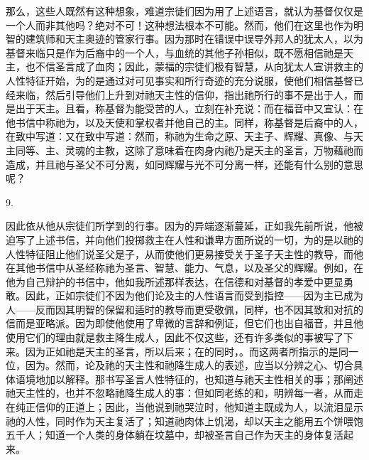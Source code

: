 那么，这些人既然有这种想象，难道宗徒们因为用了上述语言，就认为基督仅仅是一个人而非其他吗？绝对不可！这种想法根本不可能。然而，他们在这里也作为明智的建筑师和天主奥迹的管家行事。因为那时在错误中误导外邦人的犹太人，以为基督来临只是作为后裔中的一个人，与血统的其他子孙相似，既不愿相信祂是天主，也不信圣言成了血肉；因此，蒙福的宗徒们极有智慧，从向犹太人宣讲救主的人性特征开始，为的是通过对可见事实和所行奇迹的充分说服，使他们相信基督已经来临，然后引导他们上升到对祂天主性的信仰，指出祂所行的事不是出于人，而是出于天主。且看，称基督为能受苦的人，立刻在补充说：而在福音中又宣认：在他书信中称祂为，以及天使和掌权者并他自己的主。同样，称基督是后裔中的人，在致中写道：又在致中写道：然而，称祂为生命之原、天主子、辉耀、真像、与天主同等、主、灵魂的主教，这除了意味着在肉身内祂乃是天主的圣言，万物藉祂而造成，并且祂与圣父不可分离，如同辉耀与光不可分离一样，还能有什么别的意思呢？\par

9. \par

因此依从他从宗徒们所学到的行事。因为的异端逐渐蔓延，正如我先前所说，他被迫写了上述书信，并向他们投掷救主在人性和谦卑方面所说的一切，为的是以祂的人性特征阻止他们说圣父是子，从而使他们更易接受关于圣子天主性的教导，而他在其他书信中从圣经称祂为圣言、智慧、能力、气息，以及圣父的辉耀。例如，在他为自己辩护的书信中，他如我所述那样表达，在信德和对基督的孝爱中更显勇敢。因此，正如宗徒们不因为他们论及主的人性语言而受到指控——因为主已成为人——反而因其明智的保留和适时的教导而更受敬佩，同样，也不因其致和对抗的信而是亚略派。因为即使他使用了卑微的言辞和例证，但它们也出自福音，并且他使用它们的理由就是救主降生成人，因此不仅这些，还有许多类似的事被写了下来。因为正如祂是天主的圣言，所以后来；在的同时，。而这两者所指示的是同一位，因为。然而，论及祂的天主性和祂降生成人的表述，应当以分辨之心、切合具体语境地加以解释。那书写圣言人性特征的，也知道与祂天主性相关的事；那阐述祂天主性的，也并不忽略祂降生成人的事：但如同老练的和，明辨每一者，从而走在纯正信仰的正道上；因此，当他说到祂哭泣时，他知道主既成为人，以流泪显示祂的人性，同时作为天主复活了；知道祂肉体上饥渴，却以天主之能用五个饼喂饱五千人；知道一个人类的身体躺在坟墓中，却被圣言自己作为天主的身体复活起来。\par

